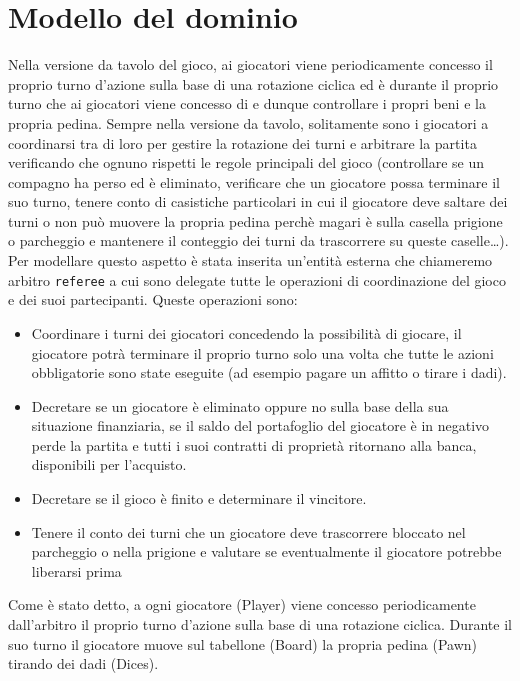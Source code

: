 \section{Modello del dominio}
Nella versione da tavolo del gioco, ai giocatori viene periodicamente concesso il proprio turno d'azione 
sulla base di una rotazione ciclica ed è durante il proprio turno che ai giocatori viene concesso di  e dunque
controllare i propri beni e la propria pedina.
Sempre nella versione da tavolo, solitamente sono i giocatori a coordinarsi tra di loro
per gestire la rotazione dei turni e arbitrare la partita verificando che ognuno rispetti le 
regole principali del gioco (controllare se un compagno ha perso 
ed è eliminato, verificare che un giocatore possa terminare il suo turno, tenere conto di casistiche particolari
in cui il giocatore deve saltare dei turni o non può muovere la propria pedina perchè magari è sulla casella prigione
o parcheggio e mantenere il conteggio dei turni da trascorrere su queste caselle\dots).\newline
Per modellare questo aspetto è stata inserita un'entità esterna che chiameremo arbitro \texttt{referee} a cui sono delegate
tutte le operazioni di coordinazione del gioco e dei suoi partecipanti. 
Queste operazioni sono:
\begin{itemize}
    \item
    Coordinare i turni dei giocatori concedendo la possibilità di giocare, 
    il giocatore potrà terminare il proprio turno solo una volta che tutte le azioni obbligatorie sono state eseguite 
    (ad esempio pagare un affitto o tirare i dadi).
    \item 
    Decretare se un giocatore è eliminato oppure no sulla base della sua situazione finanziaria,
    se il saldo del portafoglio del giocatore è in negativo perde la partita e tutti i suoi contratti di proprietà
    ritornano alla banca, disponibili per l’acquisto. 
    \item
    Decretare se il gioco è finito e determinare il vincitore.
    \item Tenere il conto dei turni che un giocatore deve trascorrere bloccato nel parcheggio o nella prigione e valutare se 
    eventualmente il giocatore potrebbe liberarsi prima
\end{itemize}
Come è stato detto, a ogni giocatore (Player) viene concesso periodicamente dall'arbitro il proprio turno d’azione sulla base di una rotazione ciclica.
Durante il suo turno il giocatore muove sul tabellone (Board) la propria pedina (Pawn) tirando dei dadi (Dices).
